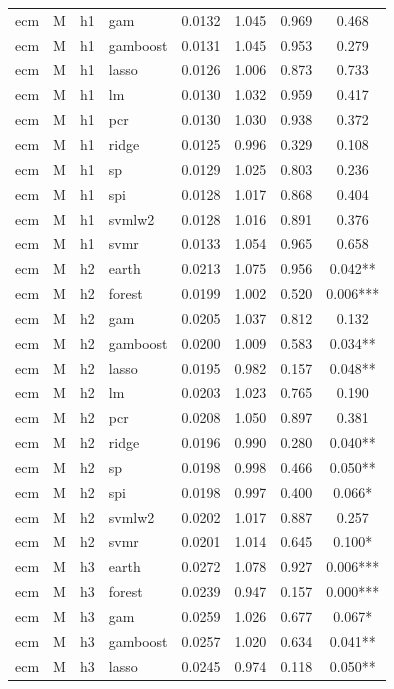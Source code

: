 \begin{ThreePartTable}
\begin{longtable}[t]{llclcccc}
ecm & M & h1 & gam & 0.0132 & 1.045 & 0.969 & 0.468\\
ecm & M & h1 & gamboost & 0.0131 & 1.045 & 0.953 & 0.279\\
ecm & M & h1 & lasso & 0.0126 & 1.006 & 0.873 & 0.733\\
ecm & M & h1 & lm & 0.0130 & 1.032 & 0.959 & 0.417\\
ecm & M & h1 & pcr & 0.0130 & 1.030 & 0.938 & 0.372\\
ecm & M & h1 & ridge & 0.0125 & 0.996 & 0.329 & 0.108\\
ecm & M & h1 & sp & 0.0129 & 1.025 & 0.803 & 0.236\\
ecm & M & h1 & spi & 0.0128 & 1.017 & 0.868 & 0.404\\
ecm & M & h1 & svmlw2 & 0.0128 & 1.016 & 0.891 & 0.376\\
ecm & M & h1 & svmr & 0.0133 & 1.054 & 0.965 & 0.658\\
\addlinespace
ecm & M & h2 & earth & 0.0213 & 1.075 & 0.956 & 0.042**\\
ecm & M & h2 & forest & 0.0199 & 1.002 & 0.520 & 0.006***\\
ecm & M & h2 & gam & 0.0205 & 1.037 & 0.812 & 0.132\\
ecm & M & h2 & gamboost & 0.0200 & 1.009 & 0.583 & 0.034**\\
ecm & M & h2 & lasso & 0.0195 & 0.982 & 0.157 & 0.048**\\
ecm & M & h2 & lm & 0.0203 & 1.023 & 0.765 & 0.190\\
ecm & M & h2 & pcr & 0.0208 & 1.050 & 0.897 & 0.381\\
ecm & M & h2 & ridge & 0.0196 & 0.990 & 0.280 & 0.040**\\
ecm & M & h2 & sp & 0.0198 & 0.998 & 0.466 & 0.050**\\
ecm & M & h2 & spi & 0.0198 & 0.997 & 0.400 & 0.066*\\
ecm & M & h2 & svmlw2 & 0.0202 & 1.017 & 0.887 & 0.257\\
ecm & M & h2 & svmr & 0.0201 & 1.014 & 0.645 & 0.100*\\
\addlinespace
ecm & M & h3 & earth & 0.0272 & 1.078 & 0.927 & 0.006***\\
ecm & M & h3 & forest & 0.0239 & 0.947 & 0.157 & 0.000***\\
ecm & M & h3 & gam & 0.0259 & 1.026 & 0.677 & 0.067*\\
ecm & M & h3 & gamboost & 0.0257 & 1.020 & 0.634 & 0.041**\\
ecm & M & h3 & lasso & 0.0245 & 0.974 & 0.118 & 0.050**\\

\end{longtable}
\end{ThreePartTable}
